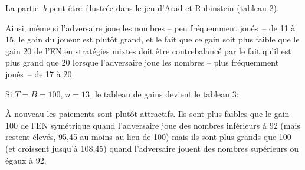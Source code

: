 \begin{Article}
\begin{refsection}[UmbhauerFR]
La partie~\emph{b} peut être illustrée dans le jeu d'Arad et Rubinstein
(tableau 2).

\begin{table}[h!]
\caption{Gain moyen de la MR stratégie mixte dans le jeu
  11-20/bonus20 en fonction du montant choisi par l'adversaire}\label{tabl2}
\centering
{}
\end{table}

Ainsi, même si l'adversaire joue les nombres -- peu fréquemment joués~--
de 11 à 15, le gain du joueur est plutôt grand, et le fait que ce gain
soit plus faible que le gain 20 de l'EN en stratégies mixtes doit être
contrebalancé par le fait qu'il est plus grand que 20 lorsque
l'adversaire joue les nombres -- plus fréquemment joués~-- de 17 à 20.

Si \(T = B = 100\), \(n = 13\)\emph{,} le tableau de gains devient le
tableau 3:

\begin{table}[h!]
\caption{Gain moyen de la MR stratégie mixte dans le jeu
  11-100/bonus100 en fonction du montant choisi par l'adversaire}\label{tabl3}
\centering
{}
\end{table}

À nouveau les paiements sont plutôt attractifs. Ils sont plus faibles
que le gain 100 de l'EN symétrique quand l'adversaire joue des nombres
inférieurs à 92 (mais restent élevés, 95,45 au moins au lieu de 100)
mais ils sont plus grands que 100 (et croissent jusqu'à 108,45) quand
l'adversaire jouent des nombres supérieurs ou égaux à 92.


\end{refsection}
\end{Article}
